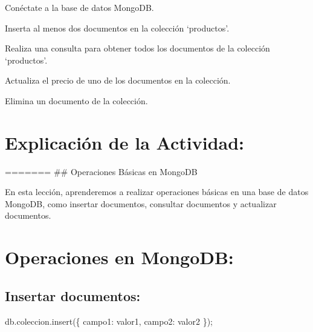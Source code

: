 \documentclass[
  a4paper,
  onepage,
  openany]{scrreprt}
\newenvironment{Shaded}{\begin{snugshade}}{\end{snugshade}}
\newcommand{\NormalTok}[1]{\textcolor[rgb]{0.00,0.23,0.31}{#1}}
\begin{document}
\begin{tcolorbox}[enhanced jigsaw, breakable, opacityback=0, toptitle=1mm, coltitle=black, toprule=.15mm, rightrule=.15mm, colframe=quarto-callout-important-color-frame, opacitybacktitle=0.6, arc=.35mm, title=\textcolor{quarto-callout-important-color}{\faExclamation}\hspace{0.5em}{Actividad Práctica:}, titlerule=0mm, colbacktitle=quarto-callout-important-color!10!white, bottomtitle=1mm, bottomrule=.15mm, colback=white, left=2mm, leftrule=.75mm]

Conéctate a la base de datos MongoDB.

Inserta al menos dos documentos en la colección `productos'.

Realiza una consulta para obtener todos los documentos de la colección
`productos'.

Actualiza el precio de uno de los documentos en la colección.

Elimina un documento de la colección.

\end{tcolorbox}

\hypertarget{explicaciuxf3n-de-la-actividad-76}{%
\section{Explicación de la
Actividad:}\label{explicaciuxf3n-de-la-actividad-76}}

======= \#\# Operaciones Básicas en MongoDB

En esta lección, aprenderemos a realizar operaciones básicas en una base
de datos MongoDB, como insertar documentos, consultar documentos y
actualizar documentos.

\hypertarget{operaciones-en-mongodb-1}{%
\section{Operaciones en MongoDB:}\label{operaciones-en-mongodb-1}}

\hypertarget{insertar-documentos-1}{%
\subsection{Insertar documentos:}\label{insertar-documentos-1}}

\begin{Shaded}
\begin{Highlighting}[]
\NormalTok{db.coleccion.insert(\{ campo1: valor1, campo2: valor2 \});}
\end{Highlighting}
\end{Shaded}
\end{document}

